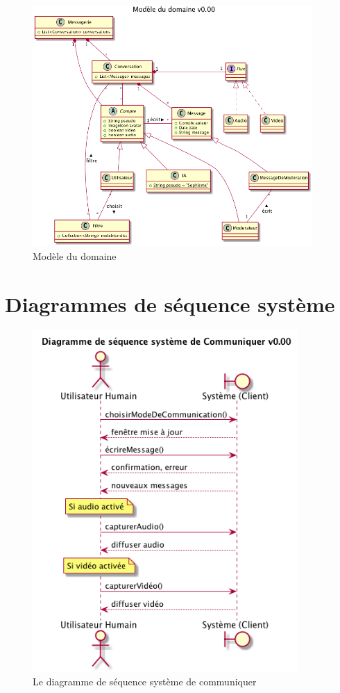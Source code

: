 \documentclass[11pt,dvipsnames,svgnames]{report}
\begin{document}
\begin{figure}[H]
\centerline{\includegraphics[width=0.95\textwidth]{diagrammes/class-diag.png}}
\caption{Modèle du domaine}
\end{figure}

\section{Diagrammes de séquence système}

\begin{figure}[H]
\centerline{\includegraphics[width=0.9\textwidth]{diagrammes/dss-communiquer.png}}
\caption{Le diagramme de séquence système de \og communiquer \fg}
\end{figure}
\end{document}
